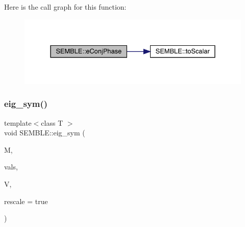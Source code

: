 Here is the call graph for this function\+:
\nopagebreak
\begin{figure}[H]
\begin{center}
\leavevmode
\includegraphics[width=331pt]{d7/dfd/namespaceSEMBLE_aab16747d17287c71280164a3a824f77f_cgraph}
\end{center}
\end{figure}
\mbox{\label{namespaceSEMBLE_a302bd8012ba286b83aeff7e786f8294e}} 
\subsubsection{\texorpdfstring{eig\_sym()}{eig\_sym()}}
{\footnotesize\ttfamily template$<$class T $>$ \\
void S\+E\+M\+B\+L\+E\+::eig\+\_\+sym (\begin{DoxyParamCaption}\item[{const \mbox{\hyperlink{structSEMBLE_1_1SembleMatrix}{Semble\+Matrix}}$<$ T $>$ \&}]{M,  }\item[{\mbox{\hyperlink{structSEMBLE_1_1SembleVector}{Semble\+Vector}}$<$ double $>$ \&}]{vals,  }\item[{\mbox{\hyperlink{structSEMBLE_1_1SembleMatrix}{Semble\+Matrix}}$<$ T $>$ \&}]{V,  }\item[{bool}]{rescale = {\ttfamily true} }\end{DoxyParamCaption})}

